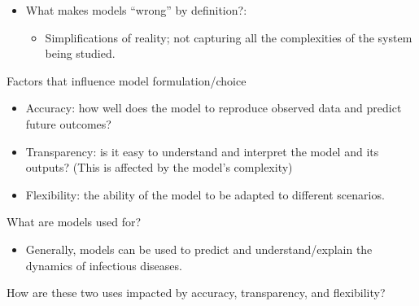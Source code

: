 \documentclass[
  ignorenonframetext,
]{beamer}
\providecommand{\tightlist}{%
  \setlength{\itemsep}{0pt}\setlength{\parskip}{0pt}}\usepackage{longtable,booktabs,array}
\begin{document}
\begin{frame}
\begin{itemize}
\tightlist
\item
  What makes models ``wrong'' by definition?:

  \begin{itemize}
  \tightlist
  \item
    Simplifications of reality; not capturing all the complexities of
    the system being studied.
  \end{itemize}
\end{itemize}
\end{frame}

\begin{frame}
\begin{block}{Factors that influence model formulation/choice}
\label{factors-that-influence-model-formulationchoice}
\begin{itemize}
\tightlist
\item
  {Accuracy}: how well does the model to reproduce observed data and
  predict future outcomes?
\item
  {Transparency}: is it easy to understand and interpret the model and
  its outputs? (This is affected by the model's complexity)
\item
  {Flexibility}: the ability of the model to be adapted to different
  scenarios.
\end{itemize}

\end{block}
\end{frame}

\begin{frame}
\begin{block}{What are models used for?}
\label{what-are-models-used-for}
\begin{itemize}
\tightlist
\item
  Generally, models can be used to predict and understand/explain the
  dynamics of infectious diseases.
\end{itemize}

\begin{tcolorbox}[enhanced jigsaw, toprule=.15mm, opacityback=0, bottomtitle=1mm, opacitybacktitle=0.6, colframe=quarto-callout-caution-color-frame, titlerule=0mm, breakable, colback=white, title={Discussion}, left=2mm, colbacktitle=quarto-callout-caution-color!10!white, arc=.35mm, coltitle=black, bottomrule=.15mm, rightrule=.15mm, leftrule=.75mm, toptitle=1mm]

How are these two uses impacted by accuracy, transparency, and
flexibility?

\end{tcolorbox}
\end{block}
\end{frame}
\end{document}
